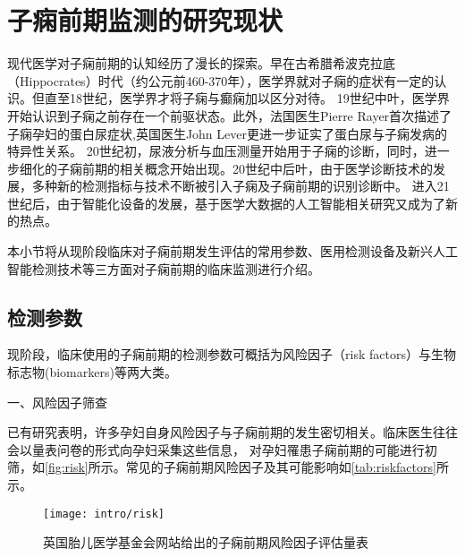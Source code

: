 \section{子痫前期监测的研究现状}
现代医学对子痫前期的认知经历了漫长的探索\cite{BJOG2016}。早在古希腊希波克拉底（Hippocrates）时代（约公元前460-370年），医学界就对子痫的症状有一定的认识。但直至18世纪，医学界才将子痫与癫痫加以区分对待。
19世纪中叶，医学界开始认识到子痫之前存在一个前驱状态。此外，法国医生Pierre Rayer首次描述了子痫孕妇的蛋白尿症状,英国医生John Lever更进一步证实了蛋白尿与子痫发病的特异性关系。
20世纪初，尿液分析与血压测量开始用于子痫的诊断，同时，进一步细化的子痫前期的相关概念开始出现。20世纪中后叶，由于医学诊断技术的发展，多种新的检测指标与技术不断被引入子痫及子痫前期的识别诊断中。
进入21世纪后，由于智能化设备的发展，基于医学大数据的人工智能相关研究又成为了新的热点。

本小节将从现阶段临床对子痫前期发生评估的常用参数、医用检测设备及新兴人工智能检测技术等三方面对子痫前期的临床监测进行介绍。
\subsection{检测参数}
现阶段，临床使用的子痫前期的检测参数可概括为风险因子（risk factors）与生物标志物(biomarkers)等两大类。

一、风险因子筛查

已有研究表明，许多孕妇自身风险因子与子痫前期的发生密切相关\cite{Magee2008,FIGO,Lowe2015,Heazell2010}。临床医生往往会以量表问卷的形式向孕妇采集这些信息，
对孕妇罹患子痫前期的可能进行初筛\cite{risks}，如\autoref{fig:risk}所示。常见的子痫前期风险因子及其可能影响如\autoref{tab:riskfactors}所示。
\begin{figure}[htbp]
    \centering
    \texttt{[image: intro/risk]}
    \caption[英国胎儿医学基金会网站给出的子痫前期风险因子评估量表]{\label{fig:risk}英国胎儿医学基金会网站给出的子痫前期风险因子评估量表\cite{risks}}
\end{figure}

